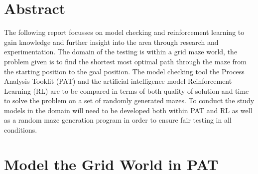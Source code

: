\documentclass[twoside, 12pt, a4paper]{article}
\begin{document}


\pagestyle{fancy}
\fancyfoot[C]{\thepage}
\fancyfoot[L,R]{}
\setcounter{page}{1}

\newpage


\tableofcontents



\newpage
{}
\setcounter{page}{1}
\pagestyle{fancy}

\fancyfoot[LE,RO]{\thepage}
\fancyfoot[C]{}
\section{Abstract}
The following report focusses on model checking and reinforcement learning to gain knowledge and further insight into the area through research and experimentation. The domain of the testing is within a grid maze world, the problem given is to find the shortest most optimal path through the maze from the starting position to the goal position. The model checking tool the Process Analysis Tooklit (PAT) and the artificial intelligence model Reinforcement Learning (RL) are to be compared in terms of both quality of solution and time to solve the problem on a set of randomly generated mazes. To conduct the study models in the domain will need to be developed both within PAT and RL as well as a random maze generation program in order to ensure fair testing in all conditions.

\section{Model the Grid World in PAT}  \label{CSys_AandD}
\end{document}
